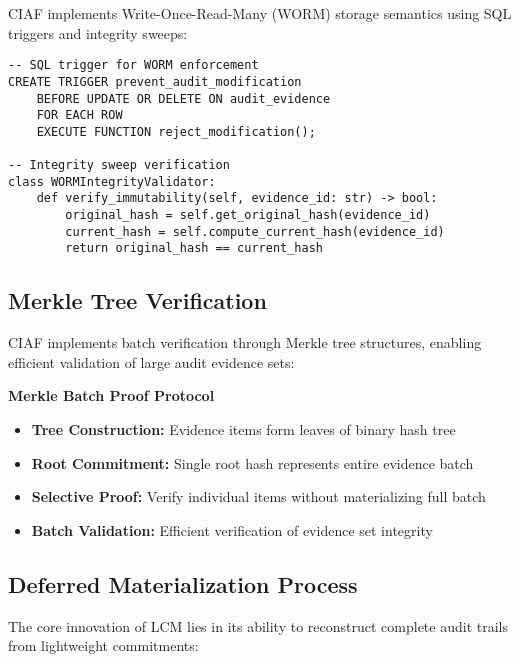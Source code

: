 \documentclass[12pt,a4paper]{article}
\begin{document}
CIAF implements Write-Once-Read-Many (WORM) storage semantics using SQL triggers and integrity sweeps:

\begin{lstlisting}[caption=WORM Enforcement Implementation]
-- SQL trigger for WORM enforcement
CREATE TRIGGER prevent_audit_modification
    BEFORE UPDATE OR DELETE ON audit_evidence
    FOR EACH ROW
    EXECUTE FUNCTION reject_modification();

-- Integrity sweep verification
class WORMIntegrityValidator:
    def verify_immutability(self, evidence_id: str) -> bool:
        original_hash = self.get_original_hash(evidence_id)
        current_hash = self.compute_current_hash(evidence_id)
        return original_hash == current_hash
\end{lstlisting}

\subsection{Merkle Tree Verification}

CIAF implements batch verification through Merkle tree structures, enabling efficient validation of large audit evidence sets:

\begin{technicalbox}
\textbf{Merkle Batch Proof Protocol}
\begin{itemize}
\item \textbf{Tree Construction:} Evidence items form leaves of binary hash tree
\item \textbf{Root Commitment:} Single root hash represents entire evidence batch
\item \textbf{Selective Proof:} Verify individual items without materializing full batch
\item \textbf{Batch Validation:} Efficient verification of evidence set integrity
\end{itemize}
\end{technicalbox}

\subsection{Deferred Materialization Process}

The core innovation of LCM lies in its ability to reconstruct complete audit trails from lightweight commitments:
\end{document}
